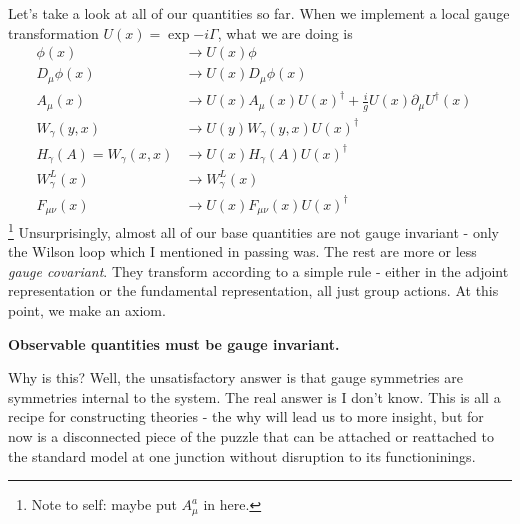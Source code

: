 \documentclass[main.tex]{subfiles}
\begin{document}
Let's take a look at all of our quantities so far. When we implement a local gauge transformation $U(x) = \exp{-i\Gamma}$, what we are doing is
\label{basetrans}
\begin{align}
\phi(x) & \to  U(x) \phi  \nonumber \\
D_\mu \phi (x) & \to U(x) D_\mu \phi(x) \nonumber \\
A_\mu (x) & \to   U(x) A_\mu (x) U(x)^\dagger + \frac{i}{g} U(x) \partial_\mu U^\dagger (x) \nonumber\\
W_\gamma (y,x) & \to  U(y) W_\gamma (y,x) U(x)^\dagger \nonumber\\
H_\gamma (A) = W_\gamma (x,x) & \to U(x) H_\gamma (A) U(x)^\dagger \nonumber\\
W^L_\gamma (x) & \to  W^L_\gamma (x) \nonumber\\
F_{\mu \nu} (x) & \to U(x) F_{\mu \nu} (x) U(x)^\dagger&
\end{align}
\footnote{Note to self: maybe put $A_\mu^a$ in here.} Unsurprisingly, almost all of our base quantities are not gauge invariant - only the Wilson loop which I mentioned in passing was. The rest are more or less \textit{gauge covariant}. They transform according to a simple rule - either in the adjoint representation or the fundamental representation, all just group actions. At this point, we make an axiom. 
\begin{center}
\textbf{Observable quantities must be gauge invariant.} 
\end{center}
Why is this? Well, the unsatisfactory answer is that gauge symmetries are symmetries internal to the system. The real answer is I don't know. This is all a recipe for constructing theories - the why will lead us to more insight, but for now is a disconnected piece of the puzzle that can be attached or reattached to the standard model at one junction without disruption to its functioninings.
\end{document}
